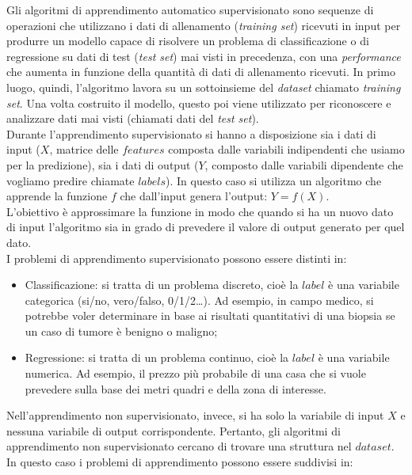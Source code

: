  Gli algoritmi di apprendimento automatico supervisionato sono sequenze di operazioni che utilizzano i dati di allenamento (\textit{training set}) ricevuti in input per produrre un modello capace di risolvere un problema di classificazione o di regressione su dati di test (\textit{test set}) mai visti in precedenza, con una \textit{performance} che aumenta in funzione della quantità di dati di allenamento ricevuti. In primo luogo, quindi, l'algoritmo lavora su un sottoinsieme del \textit{dataset} chiamato \textit{training set}. Una volta costruito il modello, questo poi viene utilizzato per riconoscere e analizzare dati mai visti (chiamati dati del \textit{test set}).\\
Durante l'apprendimento supervisionato si hanno a disposizione sia i dati di input ($X$, matrice delle $features$ composta dalle variabili indipendenti che usiamo per la predizione), sia i dati di output ($Y$, composto dalle variabili dipendente che vogliamo predire chiamate $labels$). In questo caso si utilizza un algoritmo che apprende la funzione $f$ che dall’input genera l’output: $Y= f(X)$.\\
L’obiettivo è approssimare la funzione in modo che quando si ha un nuovo dato di input l’algoritmo sia in grado di prevedere il valore di output generato per quel dato.\\
I problemi di apprendimento supervisionato possono essere distinti in:
\begin{itemize}
    \item Classificazione: si tratta di un problema discreto, cioè la $label$ è una variabile categorica (si/no, vero/falso, 0/1/2…). Ad esempio, in campo medico, si potrebbe voler determinare in base ai risultati quantitativi di una biopsia se un caso di tumore è benigno o maligno;
    \item Regressione: si tratta di un problema continuo, cioè la $label$ è una variabile numerica. Ad esempio, il prezzo più probabile di una casa che si vuole prevedere sulla base dei metri quadri e della zona di interesse.   
\end{itemize}
Nell’apprendimento non supervisionato, invece, si ha solo la variabile di input $X$ e nessuna variabile di output corrispondente. Pertanto, gli algoritmi di apprendimento non supervisionato cercano di trovare una struttura nel $dataset$.\\
In questo caso i problemi di apprendimento possono essere suddivisi in:
